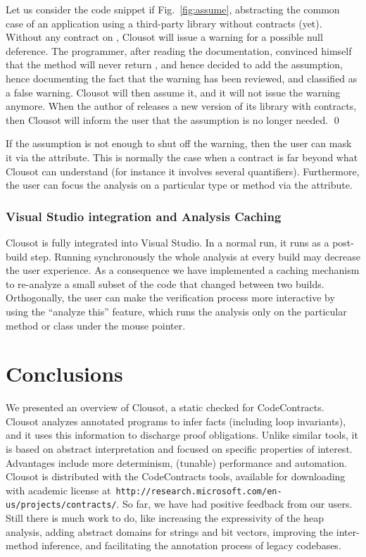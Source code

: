 \documentclass{llncs}
\begin{document}
\begin{example}
Let us consider the code snippet if Fig.~\ref{fig:assume}, abstracting
the common case of an application using a third-party library without
contracts (yet).  Without any contract on ,
Clousot will issue a warning for a possible null deference.  The
programmer, after reading the documentation, convinced himself that
the method will never return , and hence decided to add the
assumption, hence documenting the fact that the warning has been
reviewed, and classified as a false warning.  Clousot will then assume
it, and it will not issue the warning anymore.  When the author of
 releases a new version of its library with
contracts, then Clousot will inform the user that the assumption is no
longer needed.  \qed
\end{example}

If the assumption is not enough to shut off the warning, then the user can mask it via the  attribute.
This is normally the case when a contract is far beyond what Clousot can understand (for instance it involves several quantifiers).
Furthermore, the user can focus the analysis on a  particular type or method via the  attribute.

\subsubsection{Visual Studio integration and Analysis Caching}
Clousot is fully integrated into Visual Studio.  In a normal run, it
runs as a post-build step.  Running synchronously the whole analysis
at every build may decrease the user experience.  As a consequence we
have implemented a caching mechanism to re-analyze a small subset of
the code that changed between two builds.  Orthogonally, the user can
make the verification process more interactive by using the ``analyze
this'' feature, which runs the analysis only on the particular method
or class under the mouse pointer.


\section{Conclusions}
We presented an overview of Clousot, a static checked for
CodeContracts.  Clousot analyzes annotated programs to infer facts
(including loop invariants), and it uses this information to discharge
proof obligations.  Unlike similar tools, it is based on abstract
interpretation and focused on specific properties of interest.
Advantages include more determinism, (tunable) performance and
automation.  Clousot is distributed with the CodeContracts tools,
available for downloading with academic license
at~\texttt{http://research.microsoft.com/en-us/projects/contracts/}.
So far, we have had positive feedback from our users.  Still there is
much work to do, like increasing the expressivity of the heap
analysis, adding abstract domains for strings and bit vectors, 
improving the inter-method inference, and facilitating the annotation
process of legacy codebases.
\end{document}
